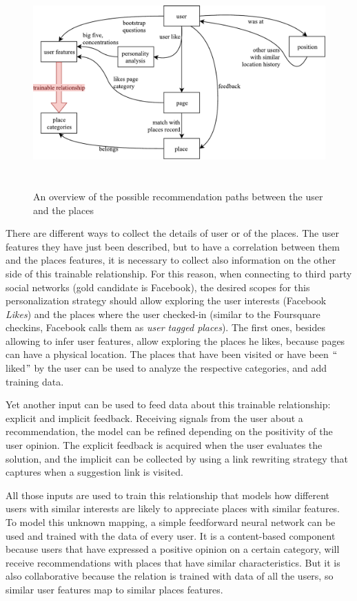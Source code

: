 \begin{figure}[!htbp]
    \centering
    \includegraphics[max width=\linewidth,max height=8cm,keepaspectratio]{figures/recommendationPaths}
    \caption{An overview of the possible recommendation paths between the user and the places}\label{fig:recommendationPaths}
\end{figure}

There are different ways to collect the details of user or of the places. The user features they have just been described, but to have a correlation between them and the places features, it is necessary to collect also information on the other side of this trainable relationship. For this reason, when connecting to third party social networks (gold candidate is Facebook), the desired scopes for this personalization strategy should allow exploring the user interests (Facebook \textit{Likes}) and the places where the user checked-in (similar to the Foursquare checkins, Facebook calls them as \textit{user tagged places}). The first ones, besides allowing to infer user features, allow exploring the places he likes, because pages can have a physical location. The places that have been visited or have been $``$liked$"$  by the user can be used to analyze the respective categories, and add training data.

Yet another input can be used to feed data about this trainable relationship: explicit and implicit feedback. Receiving signals from the user about a recommendation, the model can be refined depending on the positivity of the user opinion. The explicit feedback is acquired when the user evaluates the solution, and the implicit can be collected by using a link rewriting strategy that captures when a suggestion link is visited.

All those inputs are used to train this relationship that models how different users with similar interests are likely to appreciate places with similar features. To model this unknown mapping, a simple feedforward neural network can be used and trained with the data of every user. It is a content-based component because users that have expressed a positive opinion on a certain category, will receive recommendations with places that have similar characteristics. But it is also collaborative because the relation is trained with data of all the users, so similar user features map to similar places features.

